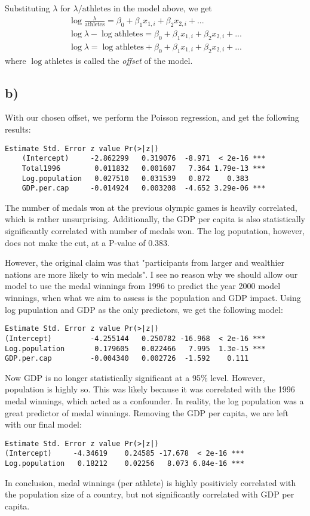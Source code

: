 \documentclass[a4paper, twocolumn]{article}
\begin{document}
Substituting $\lambda$ for $\lambda/\mathrm{athletes}$ in the model above, we get
\begin{align}
    \log{\frac{\lambda}{\mathrm{athletes}}} = \beta_0 + \beta_1 x_{1,i} + \beta_2 x_{2,i} + ... \\
    \log{\lambda} - \log{\mathrm{athletes}} = \beta_0 + \beta_1 x_{1,i} + \beta_2 x_{2,i} + ... \\
    \log{\lambda} = \log{\mathrm{athletes}} + \beta_0 + \beta_1 x_{1,i} + \beta_2 x_{2,i} + ...
\end{align}
where $\log{\mathrm{athletes}}$ is called the \textit{offset} of the model.



\subsection*{b)}
With our chosen offset, we perform the Poisson regression, and get the following results:
\begin{Verbatim}[fontsize=\scriptsize]
                    Estimate Std. Error z value Pr(>|z|)    
    (Intercept)     -2.862299   0.319076  -8.971  < 2e-16 ***
    Total1996        0.011832   0.001607   7.364 1.79e-13 ***
    Log.population   0.027510   0.031539   0.872    0.383    
    GDP.per.cap     -0.014924   0.003208  -4.652 3.29e-06 ***
\end{Verbatim}
The number of medals won at the previous olympic games is heavily correlated, which is rather unsurprising. Additionally, the GDP per capita is also statistically significantly correlated with number of medals won. The log poputation, however, does not make the cut, at a P-value of $0.383$.

However, the original claim was that "participants from larger and wealthier nations are more likely to win medals". I see no reason why we should allow our model to use the medal winnings from 1996 to predict the year 2000 model winnings, when what we aim to assess is the population and GDP impact. Using log pupulation and GDP as the only predictors, we get the following model:
\begin{Verbatim}[fontsize=\scriptsize]
                    Estimate Std. Error z value Pr(>|z|)    
(Intercept)         -4.255144   0.250782 -16.968  < 2e-16 ***
Log.population       0.179605   0.022466   7.995  1.3e-15 ***
GDP.per.cap         -0.004340   0.002726  -1.592    0.111  
\end{Verbatim}
Now GDP is no longer statistically significant at a 95\% level. However, population is highly so. This was likely because it was correlated with the 1996 medal winnings, which acted as a confounder. In reality, the log population was a great predictor of medal winnings. Removing the GDP per capita, we are left with our final model:
\begin{Verbatim}[fontsize=\scriptsize]
                Estimate Std. Error z value Pr(>|z|)    
(Intercept)     -4.34619    0.24585 -17.678  < 2e-16 ***
Log.population   0.18212    0.02256   8.073 6.84e-16 ***
\end{Verbatim}

In conclusion, medal winnings (per athlete) is highly positiviely correlated with the population size of a country, but not significantly correlated with GDP per capita.
\end{document}
